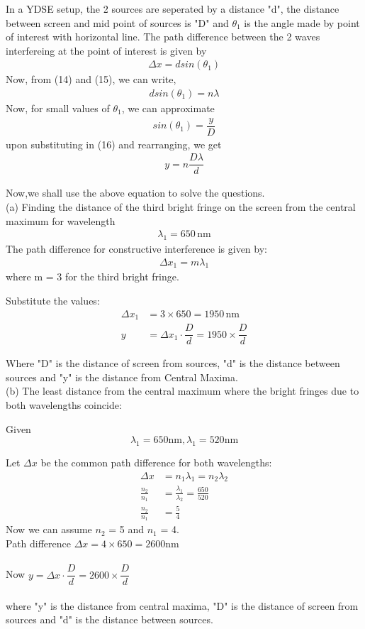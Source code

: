 \documentclass[journal,12pt,twocolumn]{IEEEtran}
\theoremstyle{remark}
\begin{document}
In a YDSE setup, the 2 sources are seperated by a distance "d", the distance between screen and mid point of sources is "D" and $\theta_1$ is the angle made by point of interest with horizontal line. The path difference between the 2 waves interfereing at the point of interest is given by 
\begin{align}
    \Delta x = dsin(\theta_1)
\end{align}
Now, from (14) and (15), we can write,
\begin{align}
    dsin(\theta_1)=n\lambda
\end{align}
Now, for small values of $\theta_1$, we can approximate 
\begin{align}
    sin(\theta_1)=\dfrac{y}{D}
\end{align}
upon substituting in (16) and rearranging, we get
\begin{align}
    y=n\dfrac{D\lambda}{d}
\end{align}

Now,we shall use the above equation to solve the questions.
\\
(a) Finding the distance of the third bright fringe on the screen from the central maximum for wavelength
\begin{align}
\lambda_1 = 650 \, \text{nm}
\end{align}
The path difference for constructive interference is given by:
\begin{align}
\Delta x_1 = m\lambda_1     
\end{align}
where  m = 3  for the third bright fringe.

Substitute the values:
\begin{align}
\Delta x_1 &= 3\times650 = 1950 \, \text{nm} \\
y &= \Delta x_1\cdot\dfrac{D}{d} = 1950\times\dfrac{D}{d}
\end{align}

Where "D" is the distance of screen from sources, "d" is the distance between sources and "y" is the distance from Central Maxima.\\


(b) The least distance from the central maximum where the bright fringes due to both wavelengths coincide:

Given \[\lambda_1 = 650 \text{nm} ,\lambda_1 = 520 \text{nm}\]

Let $\Delta x$  be the common path difference for both wavelengths:
\begin{align}
\Delta x &= n_1 \lambda_1 = n_2\lambda_2 \\
\frac{n_2}{n_1} &= \frac{\lambda_1}{\lambda_2} = \frac{650}{520}\\
\frac{n_2}{n_1} &= \frac{5}{4}
\end{align}
Now we can assume $n_2$ = 5 and $n_1$ = 4.\\
Path difference $\Delta x = 4\times650 = 2600 \text{nm}$\\\\
Now $y = \Delta x\cdot \dfrac{D}{d} = 2600\times \dfrac{D}{d}$\\\\
where "y" is the distance from central maxima, "D" is the distance of screen from sources and "d" is the distance between sources.
\end{document}
